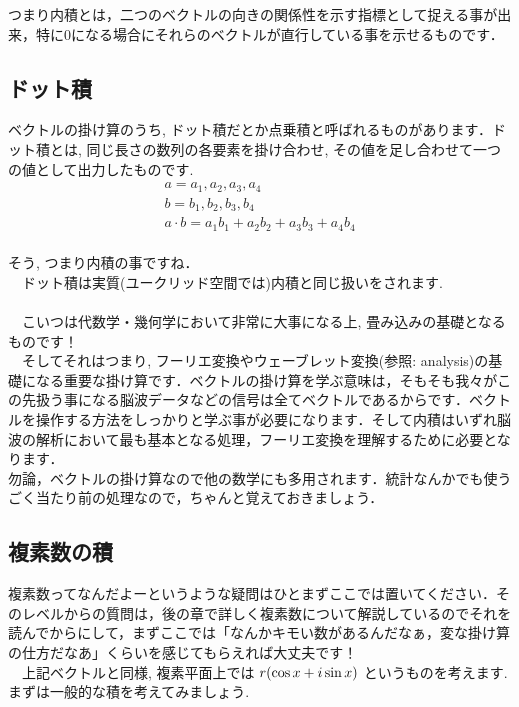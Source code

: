 \documentclass[11pt,a4paper]{ujreport}
\begin{document}
つまり内積とは，二つのベクトルの向きの関係性を示す指標として捉える事が出来，特に0になる場合にそれらのベクトルが直行している事を示せるものです．

\subsection{ドット積}
ベクトルの掛け算のうち, ドット積だとか点乗積と呼ばれるものがあります．ドット積とは, 同じ長さの数列の各要素を掛け合わせ, その値を足し合わせて一つの値として出力したものです.\\
\begin{align}
a = {a_1,a_2,a_3,a_4}\\
b={b_1,b_2,b_3,b_4}\\
a\cdot b = a_1b_1 + a_2b_2 + a_3b_3 + a_4b_4
\end{align}
\\

そう, つまり内積の事ですね．\\
　ドット積は実質(ユークリッド空間では)内積と同じ扱いをされます.\\
\\
　こいつは代数学・幾何学において非常に大事になる上, 畳み込みの基礎となるものです！\\
　そしてそれはつまり, フーリエ変換やウェーブレット変換(参照: analysis)の基礎になる重要な掛け算です．ベクトルの掛け算を学ぶ意味は，そもそも我々がこの先扱う事になる脳波データなどの信号は全てベクトルであるからです．ベクトルを操作する方法をしっかりと学ぶ事が必要になります．そして内積はいずれ脳波の解析において最も基本となる処理，フーリエ変換を理解するために必要となります．\\

勿論，ベクトルの掛け算なので他の数学にも多用されます．統計なんかでも使うごく当たり前の処理なので，ちゃんと覚えておきましょう．

\subsection{複素数の積}
複素数ってなんだよーというような疑問はひとまずここでは置いてください．そのレベルからの質問は，後の章で詳しく複素数について解説しているのでそれを読んでからにして，まずここでは「なんかキモい数があるんだなぁ，変な掛け算の仕方だなあ」くらいを感じてもらえれば大丈夫です！\\
　上記ベクトルと同様, 複素平面上では $\mathstrut r (\cos x + \mathstrut i\sin x)$ というものを考えます.\\
まずは一般的な積を考えてみましょう.\\
\end{document}
